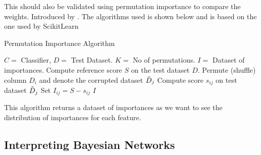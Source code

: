 This should also be validated using permutation importance to compare the weights. Introduced by \citet[p.23-25]{Breiman:2021:MachLearn}. The algorithms used is shown below and is based on the one used by ScikitLearn \cite{Pedregosa:2011:JMLR}

\begin{algorithm}
    \caption{Permutation Importance Algorithm}
    \begin{algorithmic}
        \REQUIRE $C = $ Classifier, $D = $ Test Dataset. $K = $ No of permutations.
        \ENSURE $I = $ Dataset of importances.
        \STATE Compute reference score $S$ on the test dataset $D$.
                \STATE Permute (shuffle) column $D_{i}$ and denote the corrupted dataset $\Tilde{D}_{j}$
                \STATE Compute score $s_{ij}$ on test dataset $\Tilde{D}_{j}$
                \STATE Set $I_{ij} = S - s_{ij}$
            \ENDFOR
        \ENDFOR
        \RETURN $I$ 
    \end{algorithmic}
\end{algorithm}

This algorithm returns a dataset of importances as we want to see the distribution of importances for each feature.

\subsection{Interpreting Bayesian Networks}

